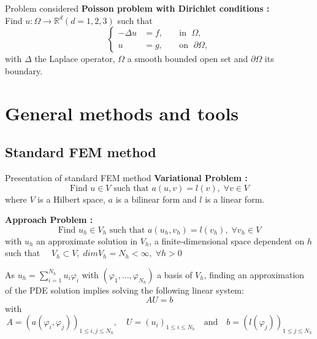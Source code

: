 \documentclass[compress,10pt,xcolor={table,dvipsnames},t]{beamer}
\begin{document}
	\begin{frame}{Problem considered}
		\textbf{Poisson problem with Dirichlet conditions :} \\
		Find $u : \Omega \rightarrow \mathbb{R}^d (d=1,2,3)$ such that
		\begin{equation*}
			\left\{
			\begin{aligned}
				-\Delta u &= f, \; &&\text{in } \; \Omega, \\
				u&=g, \; &&\text{on } \; \partial\Omega,
			\end{aligned}
			\right.
		\end{equation*}
		with $\Delta$ the Laplace operator, $\Omega$ a smooth bounded open set and $\partial\Omega$ its boundary.
	\end{frame}

	\section{General methods and tools}
	
	\subsection{Standard FEM method}
	
	\begin{frame}{Presentation of standard FEM method}	
		\textbf{Variational Problem :} 
		\begin{equation*}
			\text{Find } u\in V \text{ such that } a(u,v)=l(v), \;\forall v\in V
		\end{equation*}
		where $V$ is a Hilbert space, $a$ is a bilinear form and $l$ is a linear form.
		
		\textbf{Approach Problem :} 
		\begin{equation*}
			\text{Find } u_h\in V_h \text{ such that } a(u_h,v_h)=l(v_h), \;\forall v_h\in V
		\end{equation*}
		with $u_h$ an approximate solution in $V_h$, a finite-dimensional space dependent on $h$ such that $\quad V_h\subset V, \; dimV_h = N_h<\infty, \; \forall h>0$ 
		
		As $u_h=\sum_{i=1}^{N_h}u_i\varphi_i$ with $(\varphi_1,\dots,\varphi_{N_h})$ a basis of $V_h$, finding an approximation of the PDE solution implies solving the following linear system:
		\begin{equation*}
			AU=b
		\end{equation*}
		with
		\begin{equation*}
			A=(a(\varphi_i,\varphi_j))_{1\le i,j\le N_h}, \quad U=(u_i)_{1\le i\le N_h} \quad \text{and} \quad b=(l(\varphi_j))_{1\le j\le N_h}
		\end{equation*}
	\end{frame}
\end{document}
